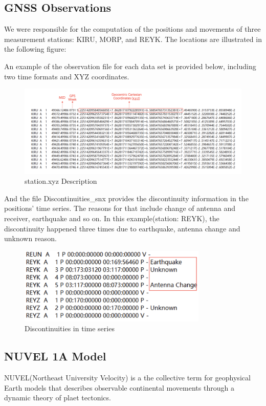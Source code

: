 \documentclass{article}
\begin{document}
\subsection{GNSS Observations}
We were responsible for the computation of the positions and movements of three measurement stations: KIRU, MORP, and REYK. The locations are illustrated in the following figure:

An example of the observation file for each data set is provided below, including two time formats and XYZ coordinates.
\begin{figure}[htbp]
    \centering
    \includegraphics[width=12cm]{./source/xyz.png}
    \caption{station.xyz Description}
    \label{fig:XYZ_obs}
\end{figure}

And the file Discontinuities\_snx provides the discontinuity information in the positions' time series. The reasons for that include change of antenna and receiver, earthquake and so on.
In this example(station: REYK), the discontinuity happened three times due to earthquake, antenna change and unknown reason.
\begin{figure}[htbp]
  \centering
  \includegraphics[width=9cm]{../source/dis.png}
  \caption{Discontinuities in time series}
  \label{fig:Dis_snx}
\end{figure}

\subsection{NUVEL 1A Model}
NUVEL(Northeast University Velocity) is a the collective term for geophysical Earth models that describes observable
continental movements through a dynamic theory of plaet tectonics.
\end{document}

